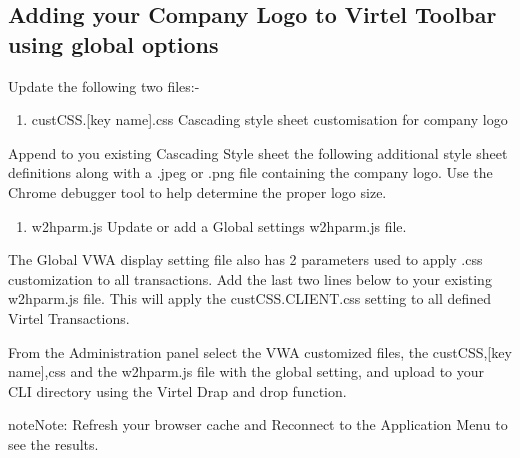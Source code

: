 \documentclass[letterpaper,10pt,english]{sphinxmanual}
\begin{document}


\subsection{Adding your Company Logo to Virtel Toolbar using global options}
\label{\detokenize{Customization:adding-your-company-logo-to-virtel-toolbar-using-global-options}}
Update the following two files:-
\begin{enumerate}
\def\theenumi{\arabic{enumi}}
\def\labelenumi{\theenumi .}
\makeatletter\def\p@enumii{\p@enumi \theenumi .}\makeatother
\item {} 
custCSS.{[}key name{]}.css      Cascading style sheet customisation for company logo

\end{enumerate}

Append to you existing Cascading Style sheet the following additional style sheet definitions along with a .jpeg or .png file containing the company logo. Use the Chrome debugger tool to help determine the proper logo size.

\begin{enumerate}
\def\theenumi{\arabic{enumi}}
\def\labelenumi{\theenumi .}
\makeatletter\def\p@enumii{\p@enumi \theenumi .}\makeatother
\setcounter{enumi}{1}
\item {} 
w2hparm.js                  Update or add a Global settings w2hparm.js file.

\end{enumerate}

The Global VWA display setting file also has 2 parameters used to apply .css customization to all transactions. Add the last two lines below to your existing w2hparm.js file.  This will apply the custCSS.CLIENT.css setting to all defined Virtel Transactions.


From the Administration panel select the VWA customized files, the custCSS,{[}key name{]},css and the w2hparm.js file with the global setting, and upload to your CLI directory using the Virtel Drap and drop function.


\begin{sphinxadmonition}{note}{Note:}
Refresh your browser cache and Reconnect to the Application Menu to see the results.
\end{sphinxadmonition}
\end{document}
